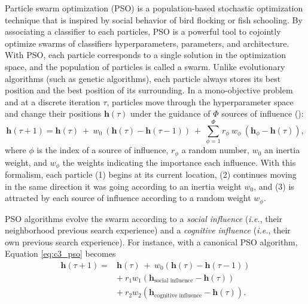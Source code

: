 Particle swarm optimization (PSO) is a population-based stochastic optimization technique that is inspired by social behavior of bird flocking or fish schooling.
By associating a classifier to each particles, PSO is a powerful tool to cojointly optimize swarms of classifiers hyperparameters, parameters, and architecture.
With PSO, each particle corresponds to a single solution in the optimization space, and the population of particles is called a swarm.
Unlike evolutionary algorithms (such as genetic algorithms), each particle always stores its best position and the best position of its surrounding.
In a mono-objective problem and at a discrete iteration $\tau$, particles move through the hyperparameter space and change their positions $\textbf{h}(\tau)$ under the guidance of $\Phi$ sources of influence (\cite{kennedy07}):
\begin{equation}  \label{sgen}
		\textbf{h}\left(\tau+1\right) = \textbf{h}(\tau) \ +\ w_0 \ 
																		( \textbf{h}(\tau) - \textbf{h}(\tau-1) )
           \ +\ \displaystyle\sum_{\phi=1}^\Phi r_\phi \ 
             w_\phi \ ( \textbf{h}_\phi - \textbf{h}(\tau) ),
\end{equation}
where $\phi$ is the index of a source of influence, $r_\phi$ a random number, $w_0$ an inertia weight, and $w_\phi$ the weights indicating the importance each influence.
With this formalism, each particle (1) begins at its current location, (2) continues moving in the same direction it was going according to an inertia weight $w_0$, and (3) is attracted by each source of influence according to a random weight $w_\phi$.

PSO algorithms evolve the swarm according to a \emph{social influence} (\emph{i.e.}, their neighborhood previous search experience) and a \emph{cognitive influence} (\emph{i.e.}, their own previous search experience).
For instance, with a canonical PSO algorithm, Equation \ref{eq:c3_pso} becomes
\begin{equation}  \label{eq:c3_pso}
	\begin{split}
		\textbf{h}\left(\tau+1\right) = & \textbf{h}(\tau) \ +\ 
						w_0( \textbf{h}(\tau) - \textbf{h}(\tau-1) ) \\
        & +\ r_1 w_1( \textbf{h}_\text{social influence} - \textbf{h}(\tau) ) \\
        & +\ r_2 w_2( \textbf{h}_\text{cognitive influence} - \textbf{h}(\tau)).
	\end{split}
\end{equation}

